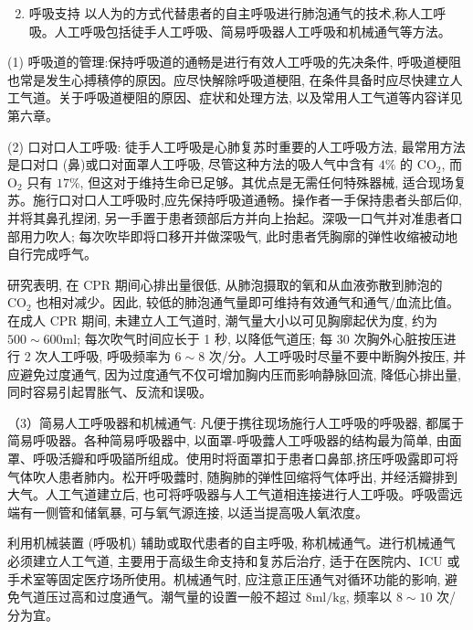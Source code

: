 \documentclass[10pt]{article}
\begin{document}
\begin{enumerate}
  \setcounter{enumi}{1}
  \item 呼吸支持 以人为的方式代替患者的自主呼吸进行肺泡通气的技术,称人工呼吸。人工呼吸包括徒手人工呼吸、简易呼吸器人工呼吸和机械通气等方法。
\end{enumerate}

(1) 呼吸道的管理:保持呼吸道的通畅是进行有效人工呼吸的先决条件, 呼吸道梗阻也常是发生心搏䅩停的原因。应尽快解除呼吸道梗阻, 在条件具备时应尽快建立人工气道。关于呼吸道梗阻的原因、症状和处理方法, 以及常用人工气道等内容详见第六章。

(2) 口对口人工呼吸: 徒手人工呼吸是心肺复苏时重要的人工呼吸方法, 最常用方法是口对口 (鼻)或口对面罩人工呼吸, 尽管这种方法的吸人气中含有 $4 \%$ 的 $\mathrm{CO}_{2}$, 而 $\mathrm{O}_{2}$ 只有 $17 \%$, 但这对于维持生命已足够。其优点是无需任何特殊器械, 适合现场复苏。施行口对口人工呼吸时,应先保持呼吸道通畅。操作者一手保持患者头部后仰, 并将其鼻孔捏闭, 另一手置于患者颈部后方并向上抬起。深吸一口气并对准患者口部用力吹人; 每次吹毕即将口移开并做深吸气, 此时患者凭胸廓的弹性收缩被动地自行完成呼气。

研究表明, 在 CPR 期间心排出量很低, 从肺泡摄取的氧和从血液弥散到肺泡的 $\mathrm{CO}_{2}$ 也相对减少。因此, 较低的肺泡通气量即可维持有效通气和通气/血流比值。在成人 CPR 期间, 未建立人工气道时, 潮气量大小以可见胸廓起伏为度, 约为 $500 \sim 600 \mathrm{ml}$; 每次吹气时间应长于 1 秒, 以降低气道压; 每 30 次胸外心脏按压进行 2 次人工呼吸, 呼吸频率为 $6 \sim 8$ 次/分。人工呼吸时尽量不要中断胸外按压, 并应避免过度通气, 因为过度通气不仅可增加胸内压而影响静脉回流, 降低心排出量, 同时容易引起胃胀气、反流和误吸。

（3）简易人工呼吸器和机械通气: 凡便于携往现场施行人工呼吸的呼吸器, 都属于简易呼吸器。各种简易呼吸器中, 以面罩-呼吸虂人工呼吸器的结构最为简单, 由面罩、呼吸活瓣和呼吸䭫所组成。使用时将面罩扣于患者口鼻部,挤压呼吸露即可将气体吹人患者肺内。松开呼吸虂时, 随胸肺的弹性回缩将气体呼出, 并经活瓣排到大气。人工气道建立后, 也可将呼吸器与人工气道相连接进行人工呼吸。呼吸䨓远端有一侧管和储氧暴, 可与氧气源连接, 以适当提高吸人氧浓度。

利用机械装置 (呼吸机) 辅助或取代患者的自主呼吸, 称机械通气。进行机械通气必须建立人工气道, 主要用于高级生命支持和复苏后治疗, 适于在医院内、ICU 或手术室等固定医疗场所使用。机械通气时, 应注意正压通气对循环功能的影响, 避免气道压过高和过度通气。潮气量的设置一般不超过 $8 \mathrm{ml} / \mathrm{kg}$, 频率以 $8 \sim 10$ 次/分为宜。
\end{document}
